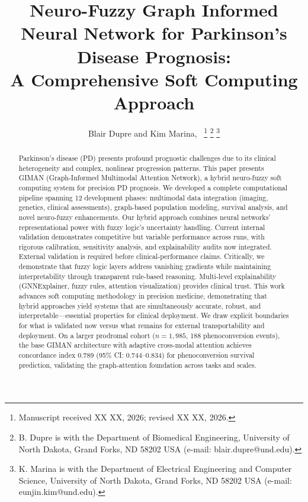 \documentclass[journal,twoside,web]{ieeecolor}
\begin{document}
\title{Neuro-Fuzzy Graph Informed Neural Network for Parkinson's Disease Prognosis:\\A Comprehensive Soft Computing Approach}

\author{Blair Dupre and Kim Marina,~
\thanks{Manuscript received XX XX, 2026; revised XX XX, 2026.}
\thanks{B. Dupre is with the Department of Biomedical Engineering, University of North Dakota, Grand Forks, ND 58202 USA (e-mail: blair.dupre@und.edu).}
\thanks{K. Marina is with the Department of Electrical Engineering and Computer Science, University of North Dakota, Grand Forks, ND 58202 USA (e-mail: eunjin.kim@und.edu).}
}

\maketitle

\begin{abstract}
Parkinson's disease (PD) presents profound prognostic challenges due to its clinical heterogeneity and complex, nonlinear progression patterns. This paper presents GIMAN (Graph-Informed Multimodal Attention Network), a hybrid neuro-fuzzy soft computing system for precision PD prognosis. We developed a complete computational pipeline spanning 12 development phases: multimodal data integration (imaging, genetics, clinical assessments), graph-based population modeling, survival analysis, and novel neuro-fuzzy enhancements. Our hybrid approach combines neural networks' representational power with fuzzy logic's uncertainty handling. Current internal validation demonstrates competitive but variable performance across runs, with rigorous calibration, sensitivity analysis, and explainability audits now integrated. External validation is required before clinical-performance claims. Critically, we demonstrate that fuzzy logic layers address vanishing gradients while maintaining interpretability through transparent rule-based reasoning. Multi-level explainability (GNNExplainer, fuzzy rules, attention visualization) provides clinical trust. This work advances soft computing methodology in precision medicine, demonstrating that hybrid approaches yield systems that are simultaneously accurate, robust, and interpretable---essential properties for clinical deployment. We draw explicit boundaries for what is validated now versus what remains for external transportability and deployment. On a larger prodromal cohort ($n=1{,}985$, 188 phenoconversion events), the base GIMAN architecture with adaptive cross-modal attention achieves concordance index 0.789 (95\% CI: 0.744--0.834) for phenoconversion survival prediction, validating the graph-attention foundation across tasks and scales.
\end{abstract}
\end{document}
